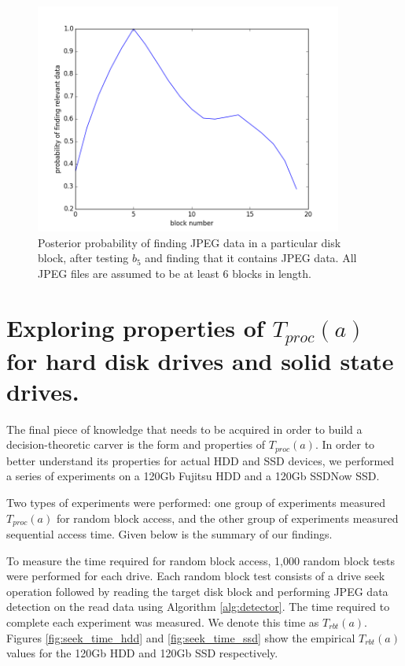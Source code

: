 \documentclass[final,5p,times,twocolumn,authoryear]{elsarticle}
\begin{document}
\begin{figure}
  \centerline{\includegraphics[width=0.9\textwidth]{fig-20blk-6min-20max-testloc-5-1-2d}}
  \caption{Posterior probability of finding JPEG data in a particular disk block, after testing $b_5$ and finding that it contains JPEG data. All JPEG files are assumed to be at least 6 blocks in length.}
  \label{fig:fig-20blk-6min-20max-testloc-5-1-2d}
\end{figure}

\section{Exploring properties of $T_{proc}(a)$ for hard disk drives and solid state drives.}
\label{sec:tproc}

The final piece of knowledge that needs to be acquired in order to build a decision-theoretic carver is the form and properties of $T_{proc}(a)$. In order to better understand its properties for actual HDD and SSD devices, we performed a series of experiments on a 120Gb Fujitsu HDD and a 120Gb SSDNow SSD. 

Two types of experiments were performed: one group of experiments measured $T_{proc}(a)$ for random block access, and the other group of experiments measured sequential access time. Given below is the summary of our findings.

To measure the time required for random block access, 1,000 random block tests were performed for each drive. Each random block test consists of a drive seek operation followed by reading the target disk block and performing JPEG data detection on the read data using Algorithm \ref{alg:detector}. The time required to complete each experiment was measured. We denote this time as $T_{rbt}(a)$. Figures \ref{fig:seek_time_hdd} and \ref{fig:seek_time_ssd} show the empirical $T_{rbt}(a)$ values for the 120Gb HDD and 120Gb SSD respectively. 
\end{document}
